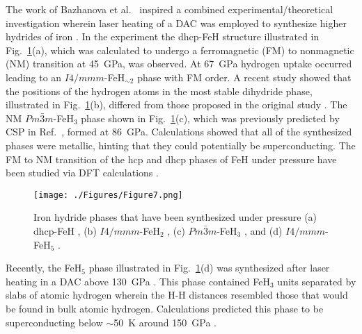 \documentclass[12pt,letterpaper,oneside]{article}
\begin{document}
The work of Bazhanova et al.\ \cite{Bazhanova:2012a} inspired a combined experimental/theoretical investigation  wherein laser heating of a DAC was employed to synthesize higher hydrides of iron \cite{Pepin:2014}. In the experiment the dhcp-FeH structure illustrated in Fig.\ \ref{fig:iron}(a), which was calculated to undergo a ferromagnetic (FM) to nonmagnetic (NM) transition at 45~GPa, was observed. At 67~GPa hydrogen uptake occurred leading to an $I4/mmm$-FeH$_{\sim2}$ phase with FM order. A recent study showed that the positions of the hydrogen atoms in the most stable dihydride phase, illustrated in Fig.\ \ref{fig:iron}(b), differed from those proposed in the original study \cite{Kvashnin:2018a}. The NM $Pm\bar{3}m$-FeH$_3$ phase shown in Fig.\ \ref{fig:iron}(c), which was previously predicted by CSP in Ref.\ \cite{Bazhanova:2012a}, formed at 86~GPa. Calculations showed that all of the synthesized phases were metallic, hinting that they could potentially be superconducting. The FM to NM transition of the hcp and dhcp phases of FeH under pressure have been studied via DFT calculations \cite{Tsumuraya:2012}. 
%
\begin{figure}[h!]
\begin{center}
\texttt{[image: ./Figures/Figure7.png]}
\end{center}
\caption{Iron hydride phases that have been synthesized under pressure (a) dhcp-FeH \cite{Pepin:2014}, (b) $I4/mmm$-FeH$_2$ \cite{Pepin:2014}, (c) $Pm\bar{3}m$-FeH$_3$ \cite{Pepin:2014}, and (d) $I4/mmm$-FeH$_5$ \cite{Pepin:2017a}.}
\label{fig:iron}
\end{figure}

Recently, the FeH$_5$ phase illustrated in Fig.\ \ref{fig:iron}(d) was synthesized after laser heating in a DAC above 130~GPa \cite{Pepin:2017a}. This phase contained FeH$_3$ units separated by slabs of atomic hydrogen wherein the H-H distances resembled those that would be found in bulk atomic hydrogen. Calculations predicted this phase to be superconducting below $\sim$50~K around 150~GPa \cite{Majumdar:2017a,Kvashnin:2018a}. 
\end{document}
